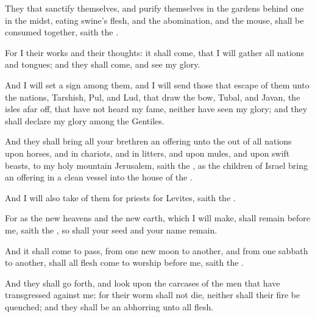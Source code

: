 {They that
sanctify themselves, and
purify themselves in the
gardens
behind
one
{} in the
midst,
eating
swine’s
flesh, and the
abomination, and the
mouse, shall be
consumed
together,
saith the
{}.

For I
{} their
works and their
thoughts: it shall
come, that I will
gather all
nations and
tongues; and they shall
come, and
see my
glory.

And I will
set a
sign among them, and I will
send those that
escape of them unto the
nations,
{}
Tarshish,
Pul, and
Lud, that
draw the
bow,
{}
Tubal, and
Javan,
{} the
isles afar
off, that have not
heard my
fame, neither have
seen my
glory; and they shall
declare my
glory among the
Gentiles.

And they shall
bring all your
brethren
{} an
offering unto the
{} out of all
nations upon
horses, and in
chariots, and in
litters, and upon
mules, and upon swift
beasts, to my
holy
mountain
Jerusalem,
saith the
{}, as the
children of
Israel
bring an
offering in a
clean
vessel into the
house of the
{}.

And I will also
take of them for
priests
{} for
Levites,
saith the
{}.

For as the
new
heavens and the
new
earth, which I will
make, shall
remain
before me,
saith the
{}, so shall your
seed and your
name
remain.

And it shall come to pass,
{}
from one new
moon to
another, and
from one
sabbath to
another, shall all
flesh
come to
worship
before me,
saith the
{}.

And they shall go
forth, and
look upon the
carcases of the
men that have
transgressed against me: for their
worm shall not
die, neither shall their
fire be
quenched; and they shall be an
abhorring unto all
flesh.


\par }